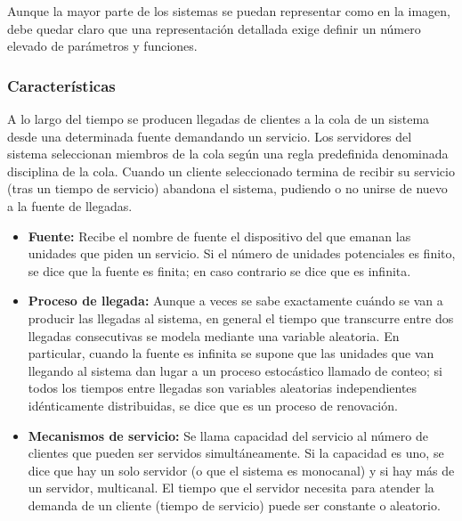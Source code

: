 \documentclass[10pt,letterpaper]{report}
\begin{document}
\begin{figure}[ht!]
\centering
{}
\end{figure}
Aunque la  mayor  parte  de  los  sistemas  se  puedan representar  como  en  la imagen,  debe  quedar  claro  que  una  representación  detallada  exige  definir  un  número elevado de parámetros y funciones.
\subsubsection*{Características}
A lo largo del tiempo se producen llegadas de clientes a la cola de un sistema desde una determinada fuente demandando un servicio. Los servidores del sistema seleccionan miembros de la cola según una regla predefinida denominada disciplina de la cola. Cuando un cliente seleccionado termina de recibir su servicio (tras un tiempo de servicio) abandona el sistema, pudiendo o no unirse de nuevo a la fuente de llegadas. 
\begin{itemize}
\item \textbf{Fuente:} Recibe el nombre de fuente el dispositivo del que emanan las unidades que piden un servicio. Si el número de unidades potenciales es finito, se dice que la fuente es finita; en caso contrario se dice que es infinita. 
\item \textbf{Proceso de llegada:} Aunque a veces se sabe exactamente cuándo se van a producir las llegadas al sistema, en general el tiempo que transcurre entre dos llegadas consecutivas se modela mediante una variable aleatoria. En particular, cuando la fuente es infinita se supone que las unidades que van llegando al sistema dan lugar a un proceso estocástico llamado de conteo; si todos los tiempos entre llegadas son variables aleatorias independientes idénticamente distribuidas, se dice que es un proceso de renovación.
\item \textbf{Mecanismos de servicio:} Se llama capacidad del servicio al número de clientes que pueden ser servidos simultáneamente. Si la capacidad es uno, se dice que hay un solo servidor (o que el sistema es monocanal) y si hay más de un servidor, multicanal. El tiempo que el servidor necesita para atender la demanda de un cliente (tiempo de servicio) puede ser constante o aleatorio.
\end{itemize}
\end{document}
